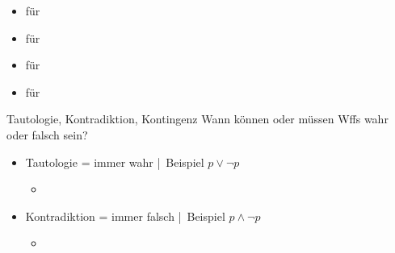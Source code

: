 \begin{frame}
{\begin{minipage}[h]{0.6\textwidth}
\begin{itemize}
\begin{itemize}[<+->]
            \item<10-> für 
            \item<11-> für 
            \item<12-> für 
            \item<13-> für 
          \end{itemize}
      \end{itemize}
    \end{minipage}%
  }
\end{frame}

\begin{frame}
  {Tautologie, Kontradiktion, Kontingenz}
  \onslide<+->
  \onslide<+->
  Wann können oder müssen Wffs wahr oder falsch sein?\\
  \Halbzeile
  \begin{itemize}[<+->]
    \item \alert{Tautologie} = immer wahr | Beispiel \alert{$p\vee\neg p$}
      \begin{itemize}[<+->]
        \item[ ] 
      \end{itemize}
    \item \alert{Kontradiktion} = immer falsch | Beispiel \alert{$p\wedge\neg p$}
      \begin{itemize}[<+->]
        \item[ ] 
      \end{itemize}

\end{itemize}
\end{frame}
